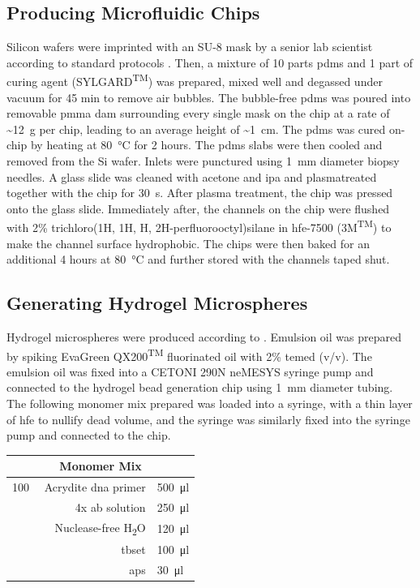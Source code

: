 \begin{appendix}
\begin{multicols}{2}
\subsection{Producing Microfluidic Chips}
\label{app:meth_mfchips}
Silicon wafers were imprinted with an SU-8 mask by a senior lab scientist according to standard protocols \citep{xia1998}. Then, a mixture of 10 parts \acrfull{pdms} and 1 part of curing agent (SYLGARD\textsuperscript{TM}) was prepared, mixed well and degassed under vacuum for 45 min to remove air bubbles. The bubble-free \acrshort{pdms} was poured into removable \acrshort{pmma} dam surrounding every single mask on the chip at a rate of \textasciitilde{}\SI{12}{\gram} per chip, leading to an average height of \textasciitilde{}\SI{1}{\centi\metre}. The \acrshort{pdms} was cured on-chip by heating at \SI{80}{\celsius} for 2 hours. The \acrshort{pdms} slabs were then cooled and removed from the Si wafer. Inlets were punctured using \SI{1}{\milli\metre} diameter biopsy needles. A glass slide was cleaned with acetone and \acrshort{ipa} and plasmatreated together with the chip for \SI{30}{\s}. After plasma treatment, the chip was pressed onto the glass slide. Immediately after, the channels on the chip were flushed with 2\% trichloro(1H, 1H, H, 2H-perfluorooctyl)silane in \acrshort{hfe}-7500 (3M\textsuperscript{TM}) to make the channel surface hydrophobic. The chips were then baked for an additional 4 hours at \SI{80}{\celsius} and further stored with the channels taped shut.\pms

\subsection{Generating Hydrogel Microspheres}
\label{app:meth_beadgen}
Hydrogel microspheres were produced according to \cite{zilionis2017}. Emulsion oil was prepared by spiking EvaGreen QX200\textsuperscript{TM} fluorinated oil with 2\% \acrshort{temed} (v/v). The emulsion oil was fixed into a CETONI 290N neMESYS syringe pump and connected to the hydrogel bead generation chip using \SI{1}{\mm} diameter tubing. The following monomer mix prepared was loaded into a syringe, with a thin layer of \acrshort{hfe} to nullify dead volume, and the syringe was similarly fixed into the syringe pump and connected to the chip.\pms

\begin{center}
\begin{tabular}{r|l}
	\multicolumn{2}{c}{Monomer Mix} \\
	\hline
	\SI{100}{\micro\molar} Acrydite \acrshort{dna} primer & \SI{500}{\ul} \\
	4x \acrshort{ab} solution & \SI{250}{\ul} \\
	Nuclease-free H\textsubscript{2}O & \SI{120}{\ul} \\
	\acrshort{tbset} & \SI{100}{\ul} \\
	\acrshort{aps} & \SI{30}{\ul} \\
\end{tabular}
\end{center}
\medskip


\end{multicols}
\end{appendix}

